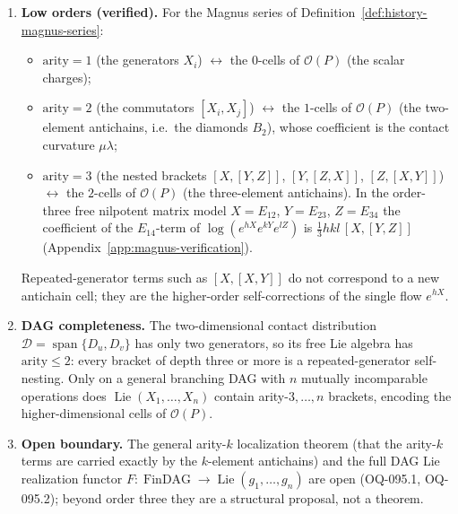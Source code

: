 \begin{proposition}
\label{prop:arity-cell-correspondence-low-order}
\begin{enumerate}
  \item \textbf{Low orders (verified).} For the Magnus series of
  Definition~\ref{def:history-magnus-series}:
  \begin{itemize}
    \item $\mathrm{arity}=1$ (the generators $X_i$) $\leftrightarrow$ the
    $0$-cells of $\mathcal O(P)$ (the scalar charges);
    \item $\mathrm{arity}=2$ (the commutators $[X_i,X_j]$) $\leftrightarrow$ the
    $1$-cells of $\mathcal O(P)$ (the two-element antichains, i.e.\ the diamonds
    $B_2$), whose coefficient is the contact curvature $\mu\lambda$;
    \item $\mathrm{arity}=3$ (the nested brackets $[X,[Y,Z]]$,
    $[Y,[Z,X]]$, $[Z,[X,Y]]$) $\leftrightarrow$ the $2$-cells of $\mathcal O(P)$
    (the three-element antichains).  In the order-three free nilpotent matrix
    model $X=E_{12}$, $Y=E_{23}$, $Z=E_{34}$ the coefficient of the
    $E_{14}$-term of $\log(e^{hX}e^{kY}e^{lZ})$ is
    $\tfrac13 hkl\,[X,[Y,Z]]$ (Appendix~\ref{app:magnus-verification}).
  \end{itemize}
  Repeated-generator terms such as $[X,[X,Y]]$ do not correspond to a new
  antichain cell; they are the higher-order self-corrections of the single flow
  $e^{hX}$.
  \item \textbf{DAG completeness.} The two-dimensional contact distribution
  $\mathcal D=\operatorname{span}\{D_u,D_v\}$ has only two generators, so its
  free Lie algebra has $\mathrm{arity}\le2$: every bracket of depth three or
  more is a repeated-generator self-nesting.  Only on a general branching DAG
  with $n$ mutually incomparable operations does $\operatorname{Lie}(X_1,\dots,X_n)$
  contain arity-$3,\dots,n$ brackets, encoding the higher-dimensional cells of
  $\mathcal O(P)$.
  \item \textbf{Open boundary.} The general arity-$k$ localization theorem (that
  the arity-$k$ terms are carried exactly by the $k$-element antichains) and the
  full DAG Lie realization functor
  $F:\operatorname{FinDAG}\to\operatorname{Lie}(g_1,\dots,g_n)$ are open
  (OQ-095.1, OQ-095.2); beyond order three they are a structural proposal, not a
  theorem.
\end{enumerate}
\end{proposition}

